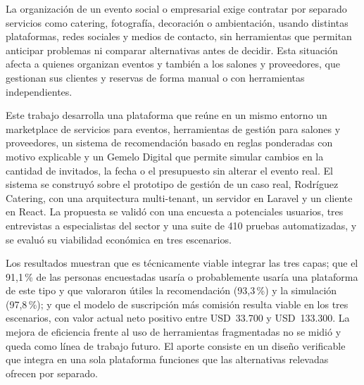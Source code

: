 
\begin{resumen}

La organización de un evento social o empresarial exige contratar por
separado servicios como catering, fotografía, decoración o ambientación,
usando distintas plataformas, redes sociales y medios de contacto, sin
herramientas que permitan anticipar problemas ni comparar alternativas
antes de decidir. Esta situación afecta a quienes organizan eventos y
también a los salones y proveedores, que gestionan sus clientes y
reservas de forma manual o con herramientas independientes.

Este trabajo desarrolla una plataforma que reúne en un mismo entorno un
marketplace de servicios para eventos, herramientas de gestión para
salones y proveedores, un sistema de recomendación basado en reglas
ponderadas con motivo explicable y un Gemelo Digital que permite simular
cambios en la cantidad de invitados, la fecha o el presupuesto sin
alterar el evento real. El sistema se construyó sobre el prototipo de
gestión de un caso real, Rodríguez Catering, con una arquitectura
multi-tenant, un servidor en Laravel y un cliente en React. La propuesta
se validó con una encuesta a potenciales usuarios, tres entrevistas a
especialistas del sector y una suite de 410 pruebas automatizadas, y se
evaluó su viabilidad económica en tres escenarios.

Los resultados muestran que es técnicamente viable integrar las tres
capas; que el 91,1\,\% de las personas encuestadas usaría o
probablemente usaría una plataforma de este tipo y que valoraron útiles la
recomendación (93,3\,\%) y la simulación (97,8\,\%); y que el modelo de
suscripción más comisión resulta viable en los tres escenarios, con valor
actual neto positivo entre USD~33.700 y USD~133.300. La mejora de
eficiencia frente al uso de herramientas fragmentadas no se midió y
queda como línea de trabajo futuro. El aporte consiste en un diseño
verificable que integra en una sola plataforma funciones que las
alternativas relevadas ofrecen por separado.

\end{resumen}
